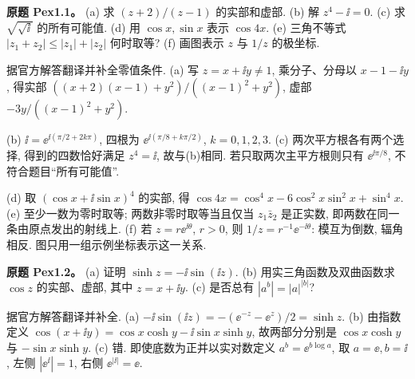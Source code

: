 \begin{exercise}\label{ass:pex1-1}
\textbf{原题 Pex1.1。} (a) 求 $(z+2)/(z-1)$ 的实部和虚部. (b) 解 $z^4-\ii=0$. (c) 求 $\sqrt{\sqrt{\ii}}$ 的所有可能值. (d) 用 $\cos x,\sin x$ 表示 $\cos4x$. (e) 三角不等式 $|z_1+z_2|\le|z_1|+|z_2|$ 何时取等? (f) 画图表示 $z$ 与 $1/z$ 的极坐标.
\end{exercise}
\begin{solution}
据官方解答翻译并补全零值条件. (a) 写 $z=x+\ii y\ne1$, 乘分子、分母以 $x-1-\ii y$, 得实部 $((x+2)(x-1)+y^2)/((x-1)^2+y^2)$, 虚部 $-3y/((x-1)^2+y^2)$.

(b) $\ii=\ee^{\ii(\pi/2+2k\pi)}$, 四根为 $\ee^{\ii(\pi/8+k\pi/2)}$, $k=0,1,2,3$. (c) 两次平方根各有两个选择, 得到的四数恰好满足 $z^4=\ii$, 故与(b)相同. 若只取两次主平方根则只有 $\ee^{\ii\pi/8}$, 不符合题目“所有可能值”.

(d) 取 $(\cos x+\ii\sin x)^4$ 的实部, 得 $\cos4x=\cos^4x-6\cos^2x\sin^2x+\sin^4x$. (e) 至少一数为零时取等; 两数非零时取等当且仅当 $z_1\bar z_2$ 是正实数, 即两数在同一条由原点发出的射线上. (f) 若 $z=r\ee^{\ii\theta}$, $r>0$, 则 $1/z=r^{-1}\ee^{-\ii\theta}$: 模互为倒数, 辐角相反. 图只用一组示例坐标表示这一关系.
\begin{center}\end{center}
\end{solution}
\begin{exercise}\label{ass:pex1-2}
\textbf{原题 Pex1.2。} (a) 证明 $\sinh z=-\ii\sin(\ii z)$. (b) 用实三角函数及双曲函数求 $\cos z$ 的实部、虚部, 其中 $z=x+\ii y$. (c) 是否总有 $|a^b|=|a|^{|b|}$?
\end{exercise}
\begin{solution}
据官方解答翻译并补全. (a) $-\ii\sin(\ii z)=-(\ee^{-z}-\ee^z)/2=\sinh z$. (b) 由指数定义 $\cos(x+\ii y)=\cos x\cosh y-\ii\sin x\sinh y$, 故两部分分别是 $\cos x\cosh y$ 与 $-\sin x\sinh y$. (c) 错. 即使底数为正并以实对数定义 $a^b=\ee^{b\log a}$, 取 $a=\ee,b=\ii$, 左侧 $|\ee^\ii|=1$, 右侧 $\ee^{|\ii|}=\ee$.
\end{solution}
